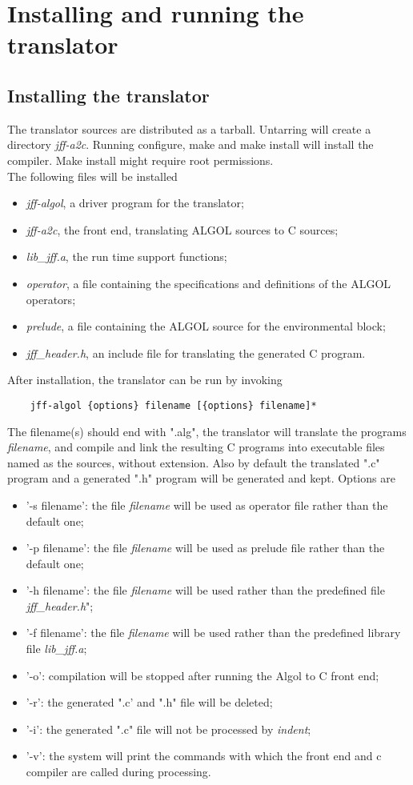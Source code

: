 \documentclass[11pt]{article}
\begin{document}
\section{Installing and running the translator}
\subsection{Installing the translator}
The translator sources are distributed as a tarball.
Untarring will create a directory {\em jff-a2c}.
Running configure, make and make install will install the compiler. Make install might require root permissions.
\ \\
The following files will be installed
\begin{itemize}
\item  {\em jff-algol}, a driver program for the translator;
\item {\em jff-a2c}, the front end, translating ALGOL sources to C sources;
\item {\em lib\_jff.a}, the run time support functions;
\item {\em operator}, a file containing the specifications and definitions of the ALGOL operators;
\item {\em prelude}, a file containing the ALGOL source for the environmental block;
\item {\em jff\_header.h}, an include file for translating the generated C program.
\end{itemize}

After installation, the translator can be run by invoking
\begin{verbatim}
    jff-algol {options} filename [{options} filename]*
\end{verbatim}

The filename(s) should end with ".alg", 
the translator will translate the programs {\em filename}, and compile and
link the resulting C programs into executable files named as the sources, without extension. Also by default the translated ".c" program and a generated ".h"
program will be generated and kept.
Options are
\begin{itemize}
\item '-s filename': the file {\em filename} will be used as operator file
rather than the default one;
\item '-p filename': the file {\em filename} will be used as prelude file
rather than the default one;
\item '-h filename': the file {\em filename} will be used rather than the
predefined file {\em jff\_header.h}";
\item '-f filename': the file {\em filename} will be used rather than the
predefined library file {\em lib\_jff.a};
\item '-o': compilation will be stopped after running the Algol to C front end;
\item '-r': the generated ".c' and ".h" file will be deleted;
\item '-i': the generated  ".c" file will not be processed by {\em indent};
\item '-v': the system will print the commands with which the front end and c compiler
are called during processing.
\end{itemize}
\end{document}
